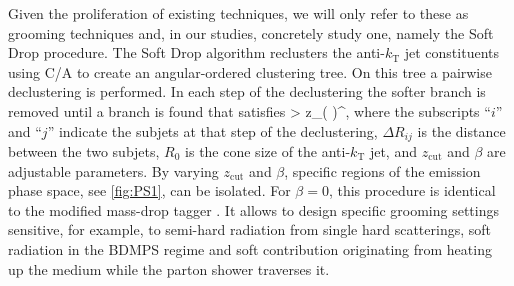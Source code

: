 Given the proliferation of existing techniques, we will only refer to these as grooming techniques and, in our studies, concretely study one, namely the Soft Drop procedure.
The Soft Drop algorithm reclusters the anti-$k_{\mathrm{T}}$ jet constituents using C/A to create an angular-ordered clustering tree. On this tree a pairwise declustering is performed. In each step of the declustering the softer branch is removed until a branch is found that satisfies
\beq
\label{eq:groompar}
 > z_{}\left(  \right)^{\beta},
\eeq
where the subscripts ``$i$'' and ``$j$'' indicate the subjets at that step of the declustering, $\Delta R_{ij}$ is the distance between the two subjets, $R_{0}$ is the cone size of the anti-$k_{\mathrm{T}}$ jet, and $z_{\text{cut}}$ and $\beta$ are adjustable parameters. By varying $z_{\text{cut}}$ and $\beta$, specific regions of the emission phase space, see \autoref{fig:PS1}, can be isolated. For $\beta = 0$, this procedure is identical to the modified mass-drop tagger \cite{Dasgupta:2013ihk}. It allows to design specific grooming settings sensitive, for example, to semi-hard radiation from single hard scatterings, soft radiation in the BDMPS regime and soft contribution originating from heating up the medium while the parton shower traverses it.

